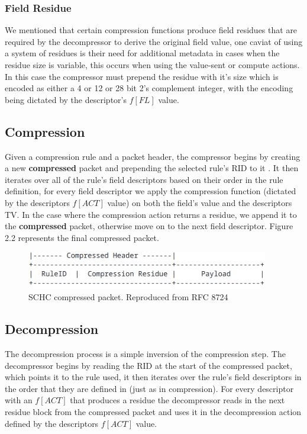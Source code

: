 \documentclass[12pt]{dalthesis}
\begin{document}
	\subsubsection{Field Residue}
	We mentioned that certain compression functions produce field residues that are required by the decompressor to derive the original
	field value, one caviat of using a system of residues is their need for additional metadata in cases when the residue size is variable,
	this occurs when using the value-sent or compute actions. In this case the compressor must prepend the residue with it's size which
	is encoded as either a 4 or 12 or 28 bit 2's complement integer, with the encoding being dictated by the descriptor's $f[FL]$ value.
	\subsection{Compression}
	Given a compression rule and a packet header, the compressor begins by creating a new \textbf{compressed}
	packet and prepending the selected rule's RID to it
	. It then iterates over all of the rule's field descriptors based on their order in the rule definition, for every field
	descriptor we apply the compression function (dictated by the descriptors $f[ACT]$ value) on both the field's value
	and the descriptors TV. In the case where the compression action returns a residue, we append it to the \textbf{compressed} packet,
	otherwise move on to the next field descriptor. Figure 2.2 represents the final compressed packet.

	\begin{figure}[h]
		\center
		\includegraphics[width=300pt]{images/schc_pkt.png}
		\caption{SCHC compressed packet. Reproduced from RFC 8724 \cite{rfc8724}}
	\end{figure}

	\subsection{Decompression}
	The decompression process is a simple inversion of the compression step. The decompressor begins by reading the RID at the 
	start of the compressed packet, which points it to the rule used, it then iterates over the rule's field descriptors in the order
	that they are defined in (just as in compression). For every descriptor with an $f[ACT]$ that produces a residue the decompressor
	reads in the next residue block from the compressed packet and uses it in the decompression action defined by the descriptors $f[ACT]$
	value.
	
\end{document}
